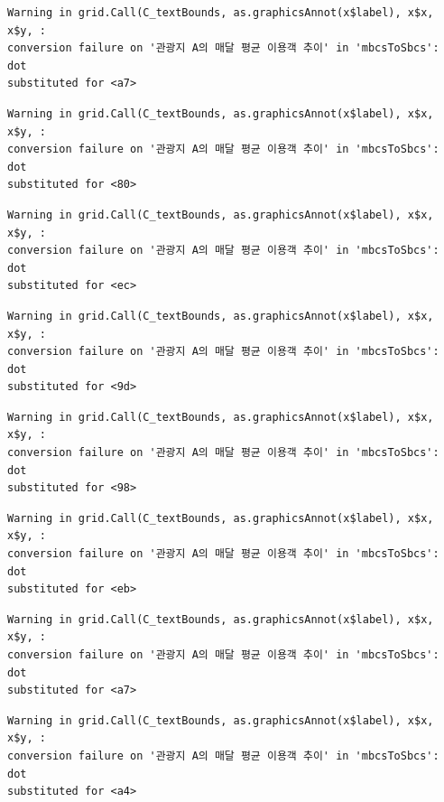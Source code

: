 \documentclass[
  letterpaper,
  DIV=11,
  numbers=noendperiod]{scrreprt}
\begin{document}
\begin{verbatim}
Warning in grid.Call(C_textBounds, as.graphicsAnnot(x$label), x$x, x$y, :
conversion failure on '관광지 A의 매달 평균 이용객 추이' in 'mbcsToSbcs': dot
substituted for <a7>
\end{verbatim}

\begin{verbatim}
Warning in grid.Call(C_textBounds, as.graphicsAnnot(x$label), x$x, x$y, :
conversion failure on '관광지 A의 매달 평균 이용객 추이' in 'mbcsToSbcs': dot
substituted for <80>
\end{verbatim}

\begin{verbatim}
Warning in grid.Call(C_textBounds, as.graphicsAnnot(x$label), x$x, x$y, :
conversion failure on '관광지 A의 매달 평균 이용객 추이' in 'mbcsToSbcs': dot
substituted for <ec>
\end{verbatim}

\begin{verbatim}
Warning in grid.Call(C_textBounds, as.graphicsAnnot(x$label), x$x, x$y, :
conversion failure on '관광지 A의 매달 평균 이용객 추이' in 'mbcsToSbcs': dot
substituted for <9d>
\end{verbatim}

\begin{verbatim}
Warning in grid.Call(C_textBounds, as.graphicsAnnot(x$label), x$x, x$y, :
conversion failure on '관광지 A의 매달 평균 이용객 추이' in 'mbcsToSbcs': dot
substituted for <98>
\end{verbatim}

\begin{verbatim}
Warning in grid.Call(C_textBounds, as.graphicsAnnot(x$label), x$x, x$y, :
conversion failure on '관광지 A의 매달 평균 이용객 추이' in 'mbcsToSbcs': dot
substituted for <eb>
\end{verbatim}

\begin{verbatim}
Warning in grid.Call(C_textBounds, as.graphicsAnnot(x$label), x$x, x$y, :
conversion failure on '관광지 A의 매달 평균 이용객 추이' in 'mbcsToSbcs': dot
substituted for <a7>
\end{verbatim}

\begin{verbatim}
Warning in grid.Call(C_textBounds, as.graphicsAnnot(x$label), x$x, x$y, :
conversion failure on '관광지 A의 매달 평균 이용객 추이' in 'mbcsToSbcs': dot
substituted for <a4>
\end{verbatim}
\end{document}
